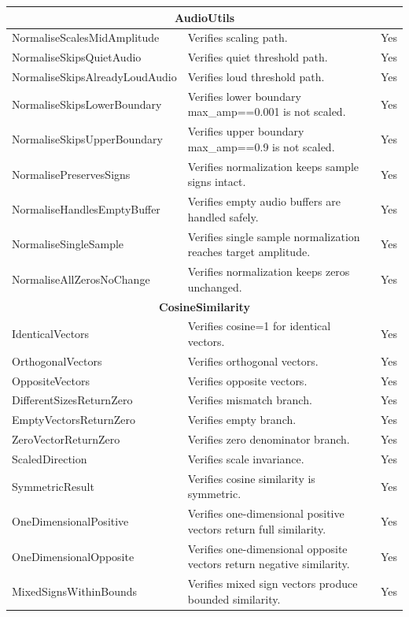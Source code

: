\begin{longtable}{|p{}|p{}|c|}
\hline
\multicolumn{3}{|c|}{\textbf{AudioUtils}} \\
\hline
NormaliseScalesMidAmplitude & Verifies scaling path. & Yes \\ \hline
NormaliseSkipsQuietAudio & Verifies quiet threshold path. & Yes \\ \hline
NormaliseSkipsAlreadyLoudAudio & Verifies loud threshold path. & Yes \\ \hline
NormaliseSkipsLowerBoundary & Verifies lower boundary max\_amp==0.001 is not scaled. & Yes \\ \hline
NormaliseSkipsUpperBoundary & Verifies upper boundary max\_amp==0.9 is not scaled. & Yes \\ \hline
NormalisePreservesSigns & Verifies normalization keeps sample signs intact. & Yes \\ \hline
NormaliseHandlesEmptyBuffer & Verifies empty audio buffers are handled safely. & Yes \\ \hline
NormaliseSingleSample & Verifies single sample normalization reaches target amplitude. & Yes \\ \hline
NormaliseAllZerosNoChange & Verifies normalization keeps zeros unchanged. & Yes \\ \hline

\hline
\multicolumn{3}{|c|}{\textbf{CosineSimilarity}} \\
\hline
IdenticalVectors & Verifies cosine=1 for identical vectors. & Yes \\ \hline
OrthogonalVectors & Verifies orthogonal vectors. & Yes \\ \hline
OppositeVectors & Verifies opposite vectors. & Yes \\ \hline
DifferentSizesReturnZero & Verifies mismatch branch. & Yes \\ \hline
EmptyVectorsReturnZero & Verifies empty branch. & Yes \\ \hline
ZeroVectorReturnZero & Verifies zero denominator branch. & Yes \\ \hline
ScaledDirection & Verifies scale invariance. & Yes \\ \hline
SymmetricResult & Verifies cosine similarity is symmetric. & Yes \\ \hline
OneDimensionalPositive & Verifies one-dimensional positive vectors return full similarity. & Yes \\ \hline
OneDimensionalOpposite & Verifies one-dimensional opposite vectors return negative similarity. & Yes \\ \hline
MixedSignsWithinBounds & Verifies mixed sign vectors produce bounded similarity. & Yes \\ \hline


\end{longtable}
